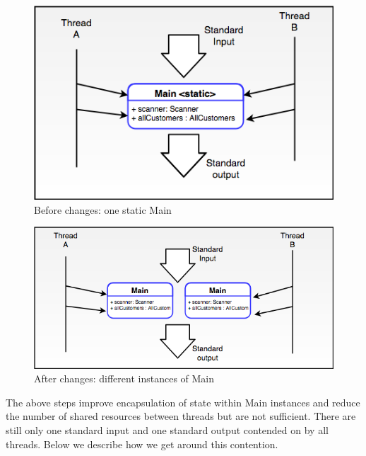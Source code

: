 \begin{minipage}[b]{0.5\textwidth}
\begin{figure}[H]
\centering
\includegraphics[scale=0.4]{res/STE-Page-1-original.png}
\caption{Before changes: one static Main}
\end{figure}
\end{minipage}
\begin{minipage}[b]{0.5\textwidth}
\begin{figure}[H]
\centering
\includegraphics[scale=0.4]{res/STE-Page-2-original.png}	
\caption{After changes: different instances of Main}
\end{figure}
\end{minipage}

The above steps improve encapsulation of state within Main instances and reduce the number of shared resources between threads but are not sufficient. There are still only one standard input and one standard output contended on by all threads. Below we describe how we get around this contention.

